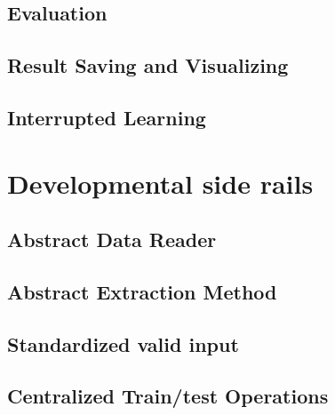 \subsection{Evaluation}

\subsection{Result Saving and Visualizing}

\subsection{Interrupted Learning}

\section{Developmental side rails}

\subsection{Abstract Data Reader}

\subsection{Abstract Extraction Method}

\subsection{Standardized valid input}

\subsection{Centralized Train/test Operations}